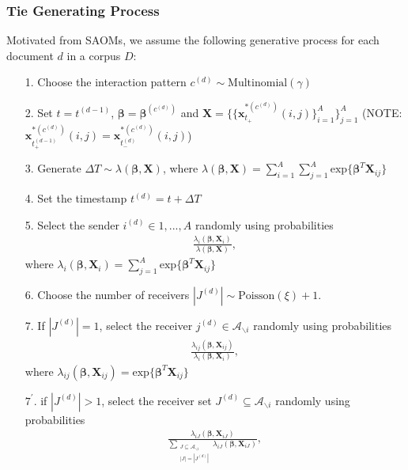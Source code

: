 \documentclass[a4paper]{article}
\begin{document}
\subsubsection{Tie Generating Process}
Motivated from SAOMs, we assume the following generative process for each document $d$ in a corpus $D$:
\begin{itemize}
	\item[1.] Choose the interaction pattern $c^{(d)} \sim \mbox{Multinomial}(\gamma)$
	\item[2.] Set $t=t^{(d-1)}$, $\boldsymbol{\beta}=\boldsymbol{\beta}^{(c^{(d)})}$ and $\boldsymbol{X}=\{\{\boldsymbol{x}^{*(c^{(d)})}_{t_+}(i, j)\}_{i=1}^{A}\}_{j=1}^{A}$ (NOTE: $\boldsymbol{x}^{*(c^{(d)})}_{t_+^{(d-1)}}(i, j) = \boldsymbol{x}^{*(c^{(d)})}_{t_-^{(d)}}(i, j) $)
	\item[3.] Generate $\Delta T \sim \lambda(\boldsymbol{\beta}, \boldsymbol{X})$, where $\lambda(\boldsymbol{\beta}, \boldsymbol{X})=\sum\limits_{i=1}^{A}\sum\limits_{j=1}^{A} \mbox{exp}\Big\{\boldsymbol{\beta}^{T}\boldsymbol{X}_{ij}\Big\}$
	 \item[4.] Set the timestamp $t^{(d)} = t+\Delta T$
	 \item[5.] Select the sender $i^{(d)} \in {1,...,A}$ randomly using probabilities \begin{align*}\frac{\lambda_i(\boldsymbol{\beta}, \boldsymbol{X}_i)}{\lambda(\boldsymbol{\beta}, \boldsymbol{X})},
	 \end{align*}
where $\lambda_i(\boldsymbol{\beta}, \boldsymbol{X}_i)=\sum\limits_{j=1}^{A} \mbox{exp}\Big\{\boldsymbol{\beta}^{T}\boldsymbol{X}_{ij}\Big\}$
\item[6.] Choose the  number of receivers $|J^{(d)}| \sim \mbox{Poisson}(\xi)+1$.
\item[7.] If $|J^{(d)}|=1$, select the receiver $j^{(d)} \in \mathcal{A}_{\backslash i}$ randomly using probabilities
\begin{align*}\frac{\lambda_{ij}(\boldsymbol{\beta}, \boldsymbol{X}_{ij})}{\lambda_i(\boldsymbol{\beta}, \boldsymbol{X}_i)},
\end{align*}
where $\lambda_{ij}(\boldsymbol{\beta}, \boldsymbol{X}_{ij})= \mbox{exp}\Big\{\boldsymbol{\beta}^{T}\boldsymbol{X}_{ij}\Big\}$
\item[$7^\prime$.] if $|J^{(d)}|>1$, select the receiver set  $J^{(d)} \subseteq \mathcal{A}_{\backslash i}$ randomly using probabilities
\begin{align*}\frac{\lambda_{iJ}(\boldsymbol{\beta}, \boldsymbol{X}_{iJ})}{\sum\limits_{\substack{J \subseteq \mathcal{A}_{\backslash i} \\|J|=|J^{(d)}|}}\lambda_{iJ}(\boldsymbol{\beta}, \boldsymbol{X}_{iJ})},

\end{align*}
\end{itemize}
\end{document}
